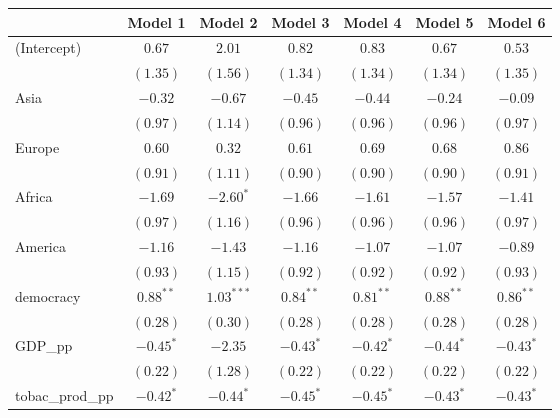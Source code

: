 
\begin{table}[!h]
\begin{center}
\begin{tabular}{l c c c c c c }
\toprule
 & Model 1 & Model 2 & Model 3 & Model 4 & Model 5 & Model 6 \\
\midrule
(Intercept)             & $0.67$       & $2.01$       & $0.82$       & $0.83$       & $0.67$       & $0.53$       \\
                        & $(1.35)$     & $(1.56)$     & $(1.34)$     & $(1.34)$     & $(1.34)$     & $(1.35)$     \\
Asia                    & $-0.32$      & $-0.67$      & $-0.45$      & $-0.44$      & $-0.24$      & $-0.09$      \\
                        & $(0.97)$     & $(1.14)$     & $(0.96)$     & $(0.96)$     & $(0.96)$     & $(0.97)$     \\
Europe                  & $0.60$       & $0.32$       & $0.61$       & $0.69$       & $0.68$       & $0.86$       \\
                        & $(0.91)$     & $(1.11)$     & $(0.90)$     & $(0.90)$     & $(0.90)$     & $(0.91)$     \\
Africa                  & $-1.69$      & $-2.60^{*}$  & $-1.66$      & $-1.61$      & $-1.57$      & $-1.41$      \\
                        & $(0.97)$     & $(1.16)$     & $(0.96)$     & $(0.96)$     & $(0.96)$     & $(0.97)$     \\
America                 & $-1.16$      & $-1.43$      & $-1.16$      & $-1.07$      & $-1.07$      & $-0.89$      \\
                        & $(0.93)$     & $(1.15)$     & $(0.92)$     & $(0.92)$     & $(0.92)$     & $(0.93)$     \\
democracy               & $0.88^{**}$  & $1.03^{***}$ & $0.84^{**}$  & $0.81^{**}$  & $0.88^{**}$  & $0.86^{**}$  \\
                        & $(0.28)$     & $(0.30)$     & $(0.28)$     & $(0.28)$     & $(0.28)$     & $(0.28)$     \\
GDP\_pp                 & $-0.45^{*}$  & $-2.35$      & $-0.43^{*}$  & $-0.42^{*}$  & $-0.44^{*}$  & $-0.43^{*}$  \\
                        & $(0.22)$     & $(1.28)$     & $(0.22)$     & $(0.22)$     & $(0.22)$     & $(0.22)$     \\
tobac\_prod\_pp         & $-0.42^{*}$  & $-0.44^{*}$  & $-0.45^{*}$  & $-0.45^{*}$  & $-0.43^{*}$  & $-0.43^{*}$  \\

\end{tabular}
\end{center}
\end{table}
